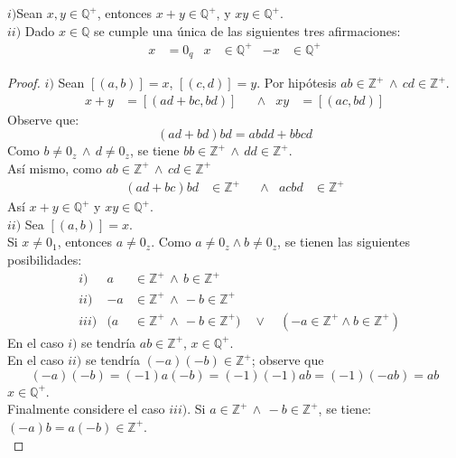 \begin{proposition}\label{prop:38}
  $i)$Sean $x,y \in \mathbb{Q}^+$, entonces $x + y \in \mathbb{Q}^+$, y $xy
  \in \mathbb{Q}^+$.\\
  $ii)$ Dado $x \in \mathbb{Q}$ se cumple una única de las siguientes tres
  afirmaciones:
  \begin{align*}
    x &= 0_q & x &\in \mathbb{Q^+} & -x &\in \mathbb{Q}^+
  \end{align*}
\end{proposition}
\begin{proof} $i)$ Sean $[(a,b)] = x$, $[(c,d)]=y$. Por hipótesis $ab \in
  \mathbb{Z}^+ \, \land \, cd \in \mathbb{Z}^+$.\\
  \begin{align*}
    x+y &= [(ad+bc, bd)] & &\land & xy &= [(ac,bd)]
  \end{align*}
  Observe que:
  \[
    (ad + bd)bd = abdd +bbcd
  \]
  Como $b \neq 0_z \, \land \, d \neq 0_z$, se tiene $bb \in \mathbb{Z}^+ \,
  \land \, dd \in \mathbb{Z}^+$.\\
  Así mismo, como $ab \in \mathbb{Z^+} \, \land \, cd\in \mathbb{Z}^+$\\
  \begin{align*}
    (ad +bc)bd &\in \mathbb{Z}^+ & &\land & acbd &\in \mathbb{Z}^+
  \end{align*}
  Así $x +y \in \mathbb{Q}^+$ y $xy \in \mathbb{Q}^+$.\\
  $ii)$ Sea $[(a,b)]=x$.\\
  Si $x \neq 0_1$, entonces $a \neq 0_z$. Como $a \neq 0_z \land b \neq 0_z$,
  se tienen las siguientes posibilidades:
  \begin{align*}
    &i) & a &\in \mathbb{Z^+}  \, \land \, b \in \mathbb{Z}^+ \\
    &ii) & -a &\in \mathbb{Z^+} \, \land \, -b \in \mathbb{Z}^+ \\
    &iii) & (a &\in \mathbb{Z^+} \, \land \,  -b \in \mathbb{Z}^+) \quad
    \lor \quad (-a \in \mathbb{Z}^+ \land b \in \mathbb{Z}^+)
  \end{align*}
  En el caso $i)$ se tendría $ab \in \mathbb{Z^+}$, $x \in \mathbb{Q}^+$.\\
  En el caso $ii)$ se tendría $(-a)(-b) \in \mathbb{Z^+}$; observe que 
  \[
    (-a)(-b) = (-1)a(-b) = (-1)(-1)ab = (-1)(-ab) = ab
  \]
  $x \in \mathbb{Q}^+$.\\
  Finalmente considere el caso $iii)$. Si $a \in \mathbb{Z}^+ \, \land \, -b
  \in \mathbb{Z}^+$, se tiene: $(-a)b = a(-b) \in \mathbb{Z}^+$.\\

\end{proof}
